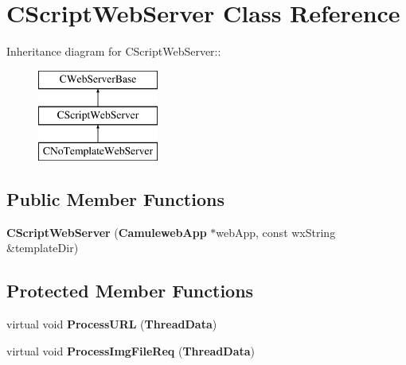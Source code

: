 \section{CScriptWebServer Class Reference}
\label{classCScriptWebServer}
Inheritance diagram for CScriptWebServer::\begin{figure}[H]
\begin{center}
\leavevmode
\includegraphics[height=3cm]{classCScriptWebServer}
\end{center}
\end{figure}
\subsection*{Public Member Functions}
\begin{DoxyCompactItemize}
\item 
{\bfseries CScriptWebServer} ({\bf CamulewebApp} $\ast$webApp, const wxString \&templateDir)\label{classCScriptWebServer_a3feec6d496d51066636830e0413d3db9}

\end{DoxyCompactItemize}
\subsection*{Protected Member Functions}
\begin{DoxyCompactItemize}
\item 
virtual void {\bfseries ProcessURL} ({\bf ThreadData})\label{classCScriptWebServer_a9b842a7727679693a6bc05f6f4d1810e}

\item 
virtual void {\bfseries ProcessImgFileReq} ({\bf ThreadData})\label{classCScriptWebServer_ac7c9e7bd880e6d0262a17235e792baa1}

\end{DoxyCompactItemize}
